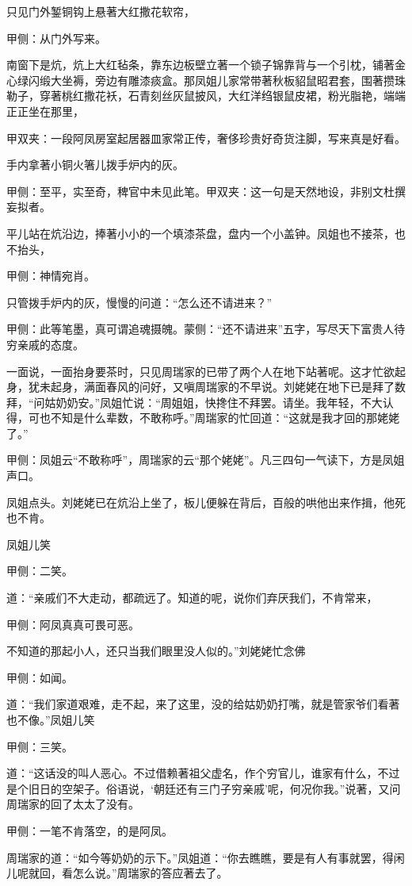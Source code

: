 \begin{parag}
    只见门外錾铜钩上悬著大红撒花软帘，\begin{note}甲侧：从门外写来。\end{note}南窗下是炕，炕上大红毡条，靠东边板壁立著一个锁子锦靠背与一个引枕，铺著金心绿闪缎大坐褥，旁边有雕漆痰盒。那凤姐儿家常带著秋板貂鼠昭君套，围著攒珠勒子，穿著桃红撒花袄，石青刻丝灰鼠披风，大红洋绉银鼠皮裙，粉光脂艳，端端正正坐在那里，\begin{note}甲双夹：一段阿凤房室起居器皿家常正传，奢侈珍贵好奇货注脚，写来真是好看。\end{note}手内拿著小铜火箸儿拨手炉内的灰。\begin{note}甲侧：至平，实至奇，稗官中未见此笔。甲双夹：这一句是天然地设，非别文杜撰妄拟者。\end{note}平儿站在炕沿边，捧著小小的一个填漆茶盘，盘内一个小盖钟。凤姐也不接茶，也不抬头，\begin{note}甲侧：神情宛肖。\end{note}只管拨手炉内的灰，慢慢的问道：“怎么还不请进来？”\begin{note}甲侧：此等笔墨，真可谓追魂摄魄。蒙侧：“还不请进来”五字，写尽天下富贵人待穷亲戚的态度。\end{note}一面说，一面抬身要茶时，只见周瑞家的已带了两个人在地下站著呢。这才忙欲起身，犹未起身，满面春风的问好，又嗔周瑞家的不早说。刘姥姥在地下已是拜了数拜，“问姑奶奶安。”凤姐忙说：“周姐姐，快搀住不拜罢。请坐。我年轻，不大认得，可也不知是什么辈数，不敢称呼。”周瑞家的忙回道：“这就是我才回的那姥姥了。”\begin{note}甲侧：凤姐云“不敢称呼”，周瑞家的云“那个姥姥”。凡三四句一气读下，方是凤姐声口。\end{note}凤姐点头。刘姥姥已在炕沿上坐了，板儿便躲在背后，百般的哄他出来作揖，他死也不肯。
\end{parag}


\begin{parag}
    凤姐儿笑\begin{note}甲侧：二笑。\end{note}道：“亲戚们不大走动，都疏远了。知道的呢，说你们弃厌我们，不肯常来，\begin{note}甲侧：阿凤真真可畏可恶。\end{note}不知道的那起小人，还只当我们眼里没人似的。”刘姥姥忙念佛\begin{note}甲侧：如闻。\end{note}道：“我们家道艰难，走不起，来了这里，没的给姑奶奶打嘴，就是管家爷们看著也不像。”凤姐儿笑\begin{note}甲侧：三笑。\end{note}道：“这话没的叫人恶心。不过借赖著祖父虚名，作个穷官儿，谁家有什么，不过是个旧日的空架子。俗语说，‘朝廷还有三门子穷亲戚’呢，何况你我。”说著，又问周瑞家的回了太太了没有。\begin{note}甲侧：一笔不肯落空，的是阿凤。\end{note}周瑞家的道：“如今等奶奶的示下。”凤姐道：“你去瞧瞧，要是有人有事就罢，得闲儿呢就回，看怎么说。”周瑞家的答应著去了。
\end{parag}


